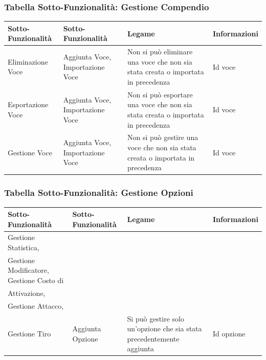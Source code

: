 \documentclass[a4paper, 11pt]{article}
\let\newline\\
\begin{document}
\vspace{2em}

\subsubsection*{Tabella Sotto-Funzionalità: Gestione Compendio}
\begin{adjustwidth}{-1cm}{-1cm}
\begin{center}
    \begin{tabular}{|p{4cm}|p{4cm}|p{4cm}|p{2.5cm}|}
        \hline
        \textbf{Sotto-Funzionalità} & \textbf{Sotto-Funzionalità} & \textbf{Legame} & \textbf{Informazioni} \\\hline
        Eliminazione Voce & Aggiunta Voce, Importazione Voce & Non si può eliminare una voce che non sia stata creata o importata in precedenza & Id voce \\\hline
        Esportazione Voce & Aggiunta Voce, Importazione Voce & Non si può esportare una voce che non sia stata creata o importata in precedenza & Id voce \\\hline
        Gestione Voce & Aggiunta Voce, Importazione Voce & Non si può gestire una voce che non sia stata creata o importata in precedenza & Id voce \\\hline
    \end{tabular}
\end{center}
\end{adjustwidth}

\vspace{2em}

\subsubsection*{Tabella Sotto-Funzionalità: Gestione Opzioni}
\begin{adjustwidth}{-1cm}{-1cm}
\begin{center}
    \begin{tabular}{|p{4cm}|p{4cm}|p{4cm}|p{2.5cm}|}
        \hline
        \textbf{Sotto-Funzionalità} & \textbf{Sotto-Funzionalità} & \textbf{Legame} & \textbf{Informazioni} \\\hline
        Gestione Statistica, \newline Gestione Modificatore, Gestione Costo di \newline Attivazione, \newline Gestione Attacco, \newline Gestione Tiro & Aggiunta Opzione & Si può gestire solo un’opzione che sia stata precedentemente aggiunta & Id opzione \\\hline
    \end{tabular}
\end{center}
\end{adjustwidth}
\end{document}

